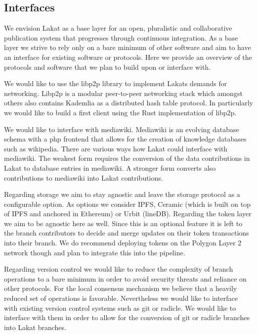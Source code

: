 \subsection{Interfaces}
\label{ssc:interfaces}

We envision Lakat as a base layer for an open, pluralistic and collaborative publication system that progresses through continuous integration. As a base layer we strive to rely only on a bare minimum of other software and aim to have an interface for existing software or protocols. Here we provide an overview of the protocols and software that we plan to build upon or interface with.

We would like to use the libp2p library to implement Lakats demands for networking. Libp2p is a modular peer-to-peer networking stack which amongst others also contains Kademlia as a distributed hash table protocol. In particularly we would like to build a first client using the Rust implementation of libp2p. 

We would like to interface with mediawiki. Mediawiki is an evolving database schema with a php frontend that allows for the creation of knowledge databases such as wikipedia. There are various ways how Lakat could interface with mediawiki. The weakest form requires the conversion of the data contributions in Lakat to database entries in mediawiki. A stronger form converts also contributions to mediawiki into Lakat contributions. 

Regarding storage we aim to stay agnostic and leave the storage protocol as a configurable option. As options we consider IPFS, Ceramic (which is built on top of IPFS and anchored in Ethereum) or Urbit (lineDB). Regarding the token layer we aim to be agnostic here as well. Since this is an optional feature it is left to the branch contributors to decide and merge updates on their token transactions into their branch. We do recommend deploying tokens on the Polygon Layer 2 network though and plan to integrate this into the pipeline.

Regarding version control we would like to reduce the complexity of branch operations to a bare minimum in order to avoid security threats and reliance on other protocols. For the local consensus mechanism we believe that a heavily reduced set of operations is favorable. Nevertheless we would like to interface with existing version control systems such as git or radicle. We would like to interface with them in order to allow for the conversion of git or radicle branches into Lakat branches.

